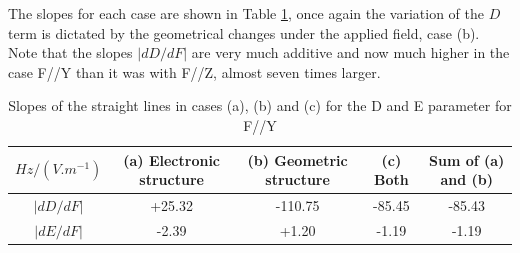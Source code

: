 \documentclass[10pt]{report}
\numberwithin{equation}{section}
\begin{document}

The slopes for each case are shown in Table \ref{tab:Slope_D_Y}, once again the variation of the $D$ term is dictated by the geometrical changes under the applied field, case (b).
Note that the slopes $|dD/dF|$ are very much additive and now much higher in the case F//Y than it was with F//Z, almost seven times larger.
\begin{table}[!h]
    \begin{tabular}{c | c c c c}
        \hline
        $Hz/(V.m^{-1})$ &  (a) Electronic structure & (b) Geometric structure & (c) Both & Sum of (a) and (b)\\
        \hline
        $|dD/dF|$ & +25.32	& -110.75 & 	-85.45 & 	-85.43\\
        $|dE/dF|$ &-2.39& 	+1.20& 	-1.19& 	-1.19\\
    \end{tabular}
    \caption{Slopes of the straight lines in cases (a), (b) and (c) for the D and E parameter for F//Y}
    \label{tab:Slope_D_Y}
\end{table}
\end{document}
